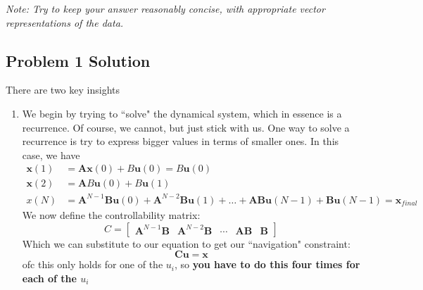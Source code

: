 \documentclass{article}
\begin{document}
    \vspace{2mm}
    \textit{Note: Try to keep your answer reasonably concise, with appropriate vector representations of the data.}

\subsection*{Problem 1 Solution}
There are two key insights
\begin{enumerate}
    \item 
    We begin by trying to ``solve" the dynamical system, which in essence is a recurrence. Of course, we cannot, but just stick with us. One way to solve a recurrence is try to express bigger values in terms of smaller ones. In this case, we have 
    \begin{align*}
        \bm{x}(1) &= \bm{A}\bm{x}(0) + B\bm{u}(0) = B\bm{u}(0) \\
        \bm{x}(2) &= \bm{A}B\bm{u}(0) + B\bm{u}(1) \\
        x(N) &= \bm{A}^{N - 1}\bm{B}\bm{u}(0) + \bm{A}^{N - 2}\bm{B}\bm{u}(1) + \dots + \bm{A}\bm{B}\bm{u}(N - 1) + \bm{B}\bm{u}(N - 1) = \bm{x}_{final}
    \end{align*}
    We now define the controllability matrix: $$C = \begin{bmatrix}
        \bm{A}^{N - 1}\bm{B} & \bm{A}^{N - 2}\bm{B} &  \cdots & \bm{A}\bm{B} & \bm{B}
    \end{bmatrix}$$
    Which we can substitute to our equation to get our ``navigation" constraint: $$\bm{C}\bm{u} = \bm{x}$$ ofc this only holds for one of the $u_{i}$, so \textbf{you have to do this four times for each of the $u_{i}$}
    \begin{center}
\end{center}
\end{enumerate}
\end{document}

